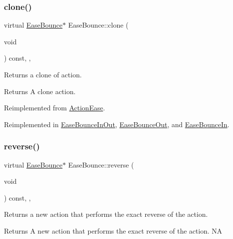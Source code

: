 \subsubsection{\texorpdfstring{clone()}{clone()}}
{\footnotesize\ttfamily virtual \hyperlink{classEaseBounce}{Ease\+Bounce}$\ast$ Ease\+Bounce\+::clone (\begin{DoxyParamCaption}\item[{void}]{ }\end{DoxyParamCaption}) const\hspace{0.3cm}{\ttfamily [inline]}, {\ttfamily [override]}, {\ttfamily [virtual]}}

Returns a clone of action.

\begin{DoxyReturn}{Returns}
A clone action. 
\end{DoxyReturn}


Reimplemented from \hyperlink{classActionEase_a39bec93fe161fb732a74d8e51a2fe08b}{Action\+Ease}.



Reimplemented in \hyperlink{classEaseBounceInOut_acc12db9c905d8d49b135e084a9beef5e}{Ease\+Bounce\+In\+Out}, \hyperlink{classEaseBounceOut_ae0c5aff0f2e8c7fcfad0d8385e1e2ec1}{Ease\+Bounce\+Out}, and \hyperlink{classEaseBounceIn_a36d193006cd57d915b764a7fc52d2768}{Ease\+Bounce\+In}.

\mbox{\label{classEaseBounce_abbd0a4bae312fa781f226cad16222773}} 
\subsubsection{\texorpdfstring{reverse()}{reverse()}}
{\footnotesize\ttfamily virtual \hyperlink{classEaseBounce}{Ease\+Bounce}$\ast$ Ease\+Bounce\+::reverse (\begin{DoxyParamCaption}\item[{void}]{ }\end{DoxyParamCaption}) const\hspace{0.3cm}{\ttfamily [inline]}, {\ttfamily [override]}, {\ttfamily [virtual]}}

Returns a new action that performs the exact reverse of the action.

\begin{DoxyReturn}{Returns}
A new action that performs the exact reverse of the action.  NA 
\end{DoxyReturn}


